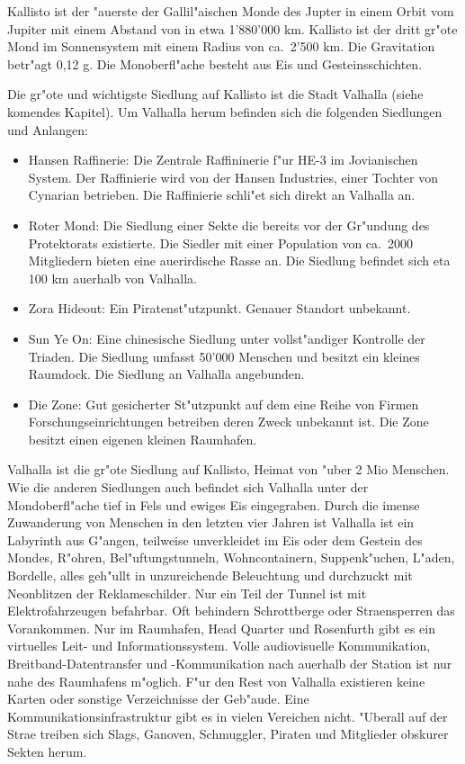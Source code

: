\clearpage\newpage
{}

Kallisto ist der "au\3erste der Gallil"aischen Monde des Jupter in einem Orbit vom Jupiter mit einem Abstand von in
etwa 1'880'000 km. Kallisto ist der dritt gr"o\3te Mond im Sonnensystem mit einem Radius von ca.~2'500 km. Die
Gravitation betr"agt 0,12 g. Die Monoberfl"ache besteht aus Eis und Gesteinsschichten.

Die gr"o\3te und wichtigste Siedlung auf Kallisto ist die Stadt Valhalla (siehe komendes Kapitel). Um Valhalla herum befinden
sich die folgenden Siedlungen und Anlangen:

\begin{itemize}
    \item Hansen Raffinerie: Die Zentrale Raffininerie f"ur HE-3 im Jovianischen System. Der Raffinierie wird von der Hansen 
    Industries, einer Tochter von Cynarian betrieben. Die Raffinierie schli"e\3t sich direkt an Valhalla an.
    \item Roter Mond: Die Siedlung einer Sekte die bereits vor der Gr"undung des Protektorats existierte. Die Siedler mit einer Population von ca.~2000 Mitgliedern bieten eine au\3erirdische Rasse an. Die Siedlung befindet sich eta 100 km au\3erhalb von Valhalla.
    \item Zora Hideout: Ein Piratenst"utzpunkt. Genauer Standort unbekannt.
    \item Sun Ye On: Eine chinesische Siedlung unter vollst"andiger Kontrolle der Triaden. Die Siedlung umfasst 50'000 Menschen und besitzt ein kleines Raumdock. Die Siedlung an Valhalla angebunden.
    \item Die Zone: Gut gesicherter St"utzpunkt auf dem eine Reihe von Firmen Forschungseinrichtungen betreiben deren Zweck unbekannt ist. Die Zone besitzt einen eigenen kleinen Raumhafen.
\end{itemize}


Valhalla ist die gr"o\3te Siedlung auf Kallisto, Heimat von "uber 2 Mio Menschen. Wie die anderen Siedlungen auch befindet sich Valhalla unter der Mondoberfl"ache tief in Fels und ewiges Eis eingegraben. Durch die imense Zuwanderung von Menschen in den letzten vier Jahren ist Valhalla ist ein Labyrinth aus G"angen, teilweise unverkleidet im Eis oder dem Gestein des Mondes, R"ohren, Bel"uftungstunneln, Wohncontainern, Suppenk"uchen, L"aden, Bordelle, alles geh"ullt in unzureichende Beleuchtung und durchzuckt mit Neonblitzen der Reklameschilder. Nur ein Teil der Tunnel ist mit Elektrofahrzeugen befahrbar. Oft behindern Schrottberge oder Stra\3ensperren das Vorankommen. Nur im Raumhafen, Head Quarter und Rosenfurth gibt es ein virtuelles Leit- und Informationssystem. Volle audiovisuelle Kommunikation, Breitband-Datentransfer und -Kommunikation nach au\3erhalb der Station ist nur nahe des Raumhafens m"oglich. F"ur den Rest von Valhalla existieren keine Karten oder sonstige Verzeichnisse der Geb"aude. Eine Kommunikationsinfrastruktur gibt es in vielen Vereichen nicht. "Uberall auf der Stra\3e treiben sich Slags, Ganoven, Schmuggler, Piraten  und Mitglieder obskurer Sekten herum.

